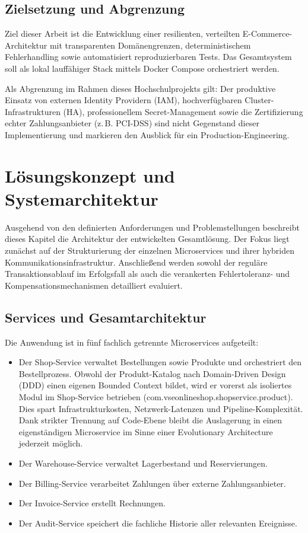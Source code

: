 \documentclass[
  11pt,
  a4paper,
  oneside,
  headings=normal,
  parskip=half,
  DIV=12
]{scrreprt}
\begin{document}
\section{Zielsetzung und Abgrenzung}

Ziel dieser Arbeit ist die Entwicklung einer resilienten, verteilten E-Commerce-Architektur mit transparenten Domänengrenzen, deterministischem Fehlerhandling sowie automatisiert reproduzierbaren Tests. Das Gesamtsystem soll als lokal lauffähiger Stack mittels Docker Compose orchestriert werden.

Als Abgrenzung im Rahmen dieses Hochschulprojekts gilt: Der produktive Einsatz von externen Identity Providern (IAM), hochverfügbaren Cluster-Infrastrukturen (HA), professionellem Secret-Management sowie die Zertifizierung echter Zahlungsanbieter (z.\,B. PCI-DSS) sind nicht Gegenstand dieser Implementierung und markieren den Ausblick für ein Production-Engineering.


\chapter{Lösungskonzept und Systemarchitektur}

Ausgehend von den definierten Anforderungen und Problemstellungen beschreibt dieses Kapitel die Architektur der entwickelten Gesamtlösung. Der Fokus liegt zunächst auf der Strukturierung der einzelnen Microservices und ihrer hybriden Kommunikationsinfrastruktur. Anschließend werden sowohl der reguläre Transaktionsablauf im Erfolgsfall als auch die verankerten Fehlertoleranz- und Kompensationsmechanismen detailliert evaluiert.

\section{Services und Gesamtarchitektur}

Die Anwendung ist in fünf fachlich getrennte Microservices aufgeteilt:

\begin{itemize}[leftmargin=1.2cm]
  \item Der Shop-Service verwaltet Bestellungen sowie Produkte und orchestriert den Bestellprozess. Obwohl der Produkt-Katalog nach Domain-Driven Design (DDD) einen eigenen Bounded Context bildet, wird er vorerst als isoliertes Modul im Shop-Service betrieben (com.vseonlineshop.shopservice.product). Dies spart Infrastrukturkosten, Netzwerk-Latenzen und Pipeline-Komplexität. Dank strikter Trennung auf Code-Ebene bleibt die Auslagerung in einen eigenständigen Microservice im Sinne einer Evolutionary Architecture jederzeit möglich.
  \item Der Warehouse-Service verwaltet Lagerbestand und Reservierungen.
  \item Der Billing-Service verarbeitet Zahlungen über externe Zahlungsanbieter.
  \item Der Invoice-Service erstellt Rechnungen.
  \item Der Audit-Service speichert die fachliche Historie aller relevanten Ereignisse.
\end{itemize}
\end{document}
